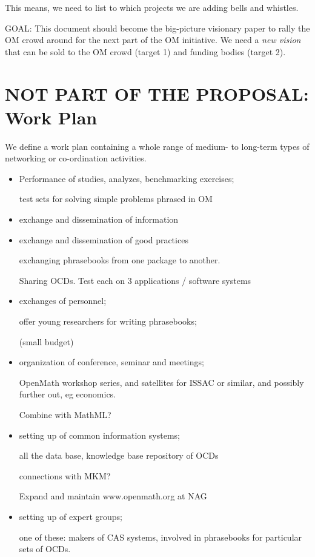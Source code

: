 \documentclass[draft]{artikel3}
\begin{document}
This means, we need to list to which projects we are adding bells and
whistles.

GOAL: This document should become the big-picture visionary paper to
rally the OM crowd around for the next part of the OM initiative.  We
need a \emph{new vision} that can be sold to the OM crowd (target 1)
and funding bodies (target 2).


\section{NOT PART OF THE PROPOSAL: Work Plan}
We define a work plan containing a whole range of medium- to long-term
types of networking or co-ordination activities.
\begin{itemize}
\item Performance of studies, analyzes, benchmarking exercises;

test sets for  solving simple problems phrased in OM


\item exchange and dissemination of information

\item exchange and dissemination of good practices

exchanging phrasebooks from one package to another.

Sharing OCDs.
Test each on 3 applications / software systems

\item exchanges of personnel;

offer young researchers for writing phrasebooks;

(small  budget)


\item organization of conference, seminar and meetings;

OpenMath workshop series, and satellites for ISSAC or similar, and
possibly further out, eg economics.

Combine with MathML?

\item setting up of common information systems;

all the data base, knowledge base repository of OCDs

connections with MKM?

Expand and maintain www.openmath.org at NAG


\item setting up of expert groups;

one of these: makers of CAS systems, involved in phrasebooks for
particular sets of OCDs.


\end{itemize}
\end{document}
